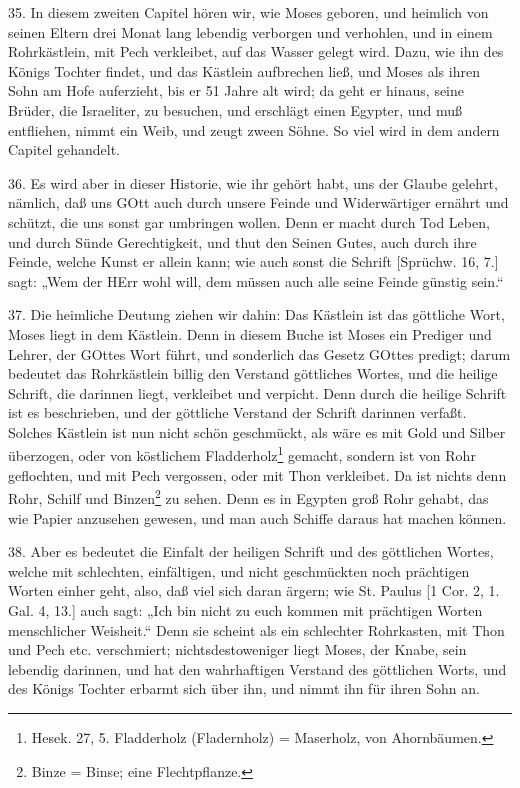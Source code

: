 35. In diesem zweiten Capitel hören wir, wie Moses geboren, und heimlich von seinen Eltern drei Monat lang lebendig verborgen und verhohlen, und in einem Rohrkästlein, mit Pech verkleibet, auf das Wasser gelegt wird. Dazu, wie ihn des Königs Tochter findet, und das Kästlein aufbrechen ließ, und Moses als ihren Sohn am Hofe auferzieht, bis er 51 Jahre alt wird; da geht er hinaus, seine Brüder, die Israeliter, zu besuchen, und erschlägt einen Egypter, und muß entfliehen, nimmt ein Weib, und zeugt zween Söhne. So viel wird in dem andern Capitel gehandelt.

36. Es wird aber in dieser Historie, wie ihr gehört habt, uns der Glaube gelehrt, nämlich, daß uns GOtt auch durch unsere Feinde und Widerwärtiger ernährt und schützt, die uns sonst gar umbringen wollen. Denn er macht durch Tod Leben, und durch Sünde Gerechtigkeit, und thut den Seinen Gutes, auch durch ihre Feinde, welche Kunst er allein kann; wie auch sonst die Schrift [Sprüchw. 16, 7.] sagt: „Wem der HErr wohl will, dem müssen auch alle seine Feinde günstig sein.“

37. Die heimliche Deutung ziehen wir dahin: Das Kästlein ist das göttliche Wort, Moses liegt in dem Kästlein. Denn in diesem Buche ist Moses ein Prediger und Lehrer, der GOttes Wort führt, und sonderlich das Gesetz GOttes predigt; darum bedeutet das Rohrkästlein billig den Verstand göttliches Wortes, und die heilige Schrift, die darinnen liegt, verkleibet und verpicht. Denn durch die heilige Schrift ist es beschrieben, und der göttliche Verstand der Schrift darinnen verfaßt. Solches Kästlein ist nun nicht schön geschmückt, als wäre es mit Gold und Silber überzogen, oder von köstlichem Fladderholz\footnote{Hesek. 27, 5. Fladderholz (Fladernholz) = Maserholz, von Ahornbäumen.} gemacht, sondern ist von Rohr geflochten, und mit Pech vergossen, oder mit Thon verkleibet. Da ist nichts denn Rohr, Schilf und Binzen\footnote{Binze = Binse; eine Flechtpflanze.} zu sehen. Denn es in Egypten groß Rohr gehabt, das wie Papier anzusehen gewesen, und man auch Schiffe daraus hat machen können.

38. Aber es bedeutet die Einfalt der heiligen Schrift und des göttlichen Wortes, welche mit schlechten, einfältigen, und nicht geschmückten noch prächtigen Worten einher geht, also, daß viel sich daran ärgern; wie St. Paulus [1 Cor. 2, 1. Gal. 4, 13.] auch sagt: „Ich bin nicht zu euch kommen mit prächtigen Worten menschlicher Weisheit.“ Denn sie scheint als ein schlechter Rohrkasten, mit Thon und Pech etc. verschmiert; nichtsdestoweniger liegt Moses, der Knabe, sein lebendig darinnen, und hat den wahrhaftigen Verstand des göttlichen Worts, und des Königs Tochter erbarmt sich über ihn, und nimmt ihn für ihren Sohn an.

